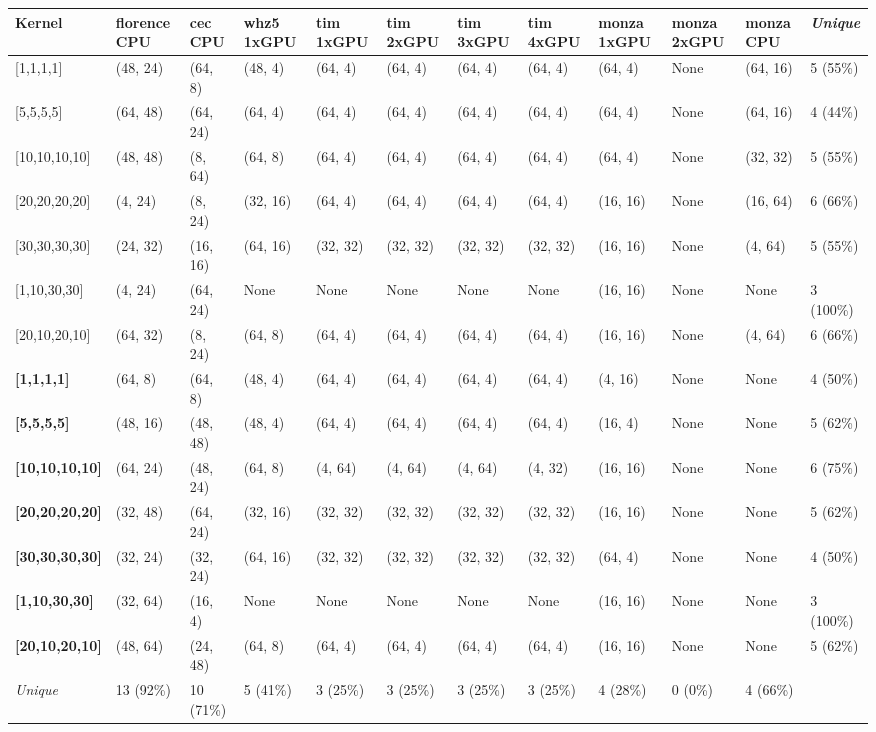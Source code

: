\begin{tabular}{|p{1.8cm} | p{1cm} | p{1cm} | p{1cm} | p{1cm} | p{1cm} | p{1cm} | p{1cm} | p{1cm} | p{1cm} | p{1cm} | p{1.1cm}|}
\hline
\textbf{Kernel} & \textbf{florence CPU} & \textbf{cec CPU} & \textbf{whz5 1xGPU} & \textbf{tim 1xGPU} & \textbf{tim 2xGPU} & \textbf{tim 3xGPU} & \textbf{tim 4xGPU} & \textbf{monza 1xGPU} & \textbf{monza 2xGPU} & \textbf{monza CPU} & \textit{Unique}\\
\hline
{[}1,1,1,1{]} & (48, 24) & (64, 8) & (48, 4) & (64, 4) & (64, 4) & (64, 4) & (64, 4) & (64, 4) & None & (64, 16) & 5 (55\%)\\
{[}5,5,5,5{]} & (64, 48) & (64, 24) & (64, 4) & (64, 4) & (64, 4) & (64, 4) & (64, 4) & (64, 4) & None & (64, 16) & 4 (44\%)\\
{[}10,10,10,10{]} & (48, 48) & (8, 64) & (64, 8) & (64, 4) & (64, 4) & (64, 4) & (64, 4) & (64, 4) & None & (32, 32) & 5 (55\%)\\
{[}20,20,20,20{]} & (4, 24) & (8, 24) & (32, 16) & (64, 4) & (64, 4) & (64, 4) & (64, 4) & (16, 16) & None & (16, 64) & 6 (66\%)\\
{[}30,30,30,30{]} & (24, 32) & (16, 16) & (64, 16) & (32, 32) & (32, 32) & (32, 32) & (32, 32) & (16, 16) & None & (4, 64) & 5 (55\%)\\
{[}1,10,30,30{]} & (4, 24) & (64, 24) & None & None & None & None & None & (16, 16) & None & None & 3 (100\%)\\
{[}20,10,20,10{]} & (64, 32) & (8, 24) & (64, 8) & (64, 4) & (64, 4) & (64, 4) & (64, 4) & (16, 16) & None & (4, 64) & 6 (66\%)\\
\textbf{{[}1,1,1,1{]}} & (64, 8) & (64, 8) & (48, 4) & (64, 4) & (64, 4) & (64, 4) & (64, 4) & (4, 16) & None & None & 4 (50\%)\\
\textbf{{[}5,5,5,5{]}} & (48, 16) & (48, 48) & (48, 4) & (64, 4) & (64, 4) & (64, 4) & (64, 4) & (16, 4) & None & None & 5 (62\%)\\
\textbf{{[}10,10,10,10{]}} & (64, 24) & (48, 24) & (64, 8) & (4, 64) & (4, 64) & (4, 64) & (4, 32) & (16, 16) & None & None & 6 (75\%)\\
\textbf{{[}20,20,20,20{]}} & (32, 48) & (64, 24) & (32, 16) & (32, 32) & (32, 32) & (32, 32) & (32, 32) & (16, 16) & None & None & 5 (62\%)\\
\textbf{{[}30,30,30,30{]}} & (32, 24) & (32, 24) & (64, 16) & (32, 32) & (32, 32) & (32, 32) & (32, 32) & (64, 4) & None & None & 4 (50\%)\\
\textbf{{[}1,10,30,30{]}} & (32, 64) & (16, 4) & None & None & None & None & None & (16, 16) & None & None & 3 (100\%)\\
\textbf{{[}20,10,20,10{]}} & (48, 64) & (24, 48) & (64, 8) & (64, 4) & (64, 4) & (64, 4) & (64, 4) & (16, 16) & None & None & 5 (62\%)\\
\hline
\textit{Unique} & 13 (92\%) & 10 (71\%) & 5 (41\%) & 3 (25\%) & 3 (25\%) & 3 (25\%) & 3 (25\%) & 4 (28\%) & 0 (0\%) & 4 (66\%) & \\
\hline
\end{tabular}
